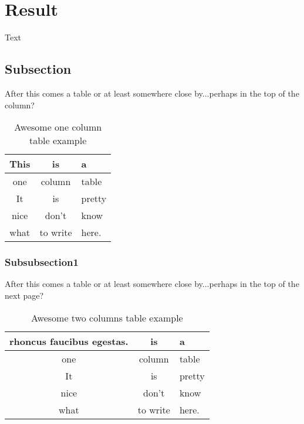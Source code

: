 \section{Result}\label{sec:result}
Text

\subsection{Subsection}
After this comes a table or at least somewhere close by...perhaps in the top
of the column?
\begin{table}
\centering
    \caption{Awesome one column table example}
    \begin{tabular}{|c|c|l|} \hline
    \label{table:one_column}
        This & is & a \\ \hline
        one & column & table\\ \hline
        It & is & pretty \\ \hline
        nice & don't & know \\ \hline
        what & to write & here.\\
        \hline
    \end{tabular}
\end{table}

\subsubsection{Subsubsection1}
After this comes a table or at least somewhere close by...perhaps in the top
of the next page?
\begin{table*}
\centering
    \caption{Awesome two columns table example}
    \begin{tabular}{|c|c|l|} \hline
    \label{table:two_columns}
        rhoncus faucibus egestas. & is & a \\ \hline
        one & column & table\\ \hline
        It & is & pretty \\ \hline
        nice & don't & know \\ \hline
        what & to write & here.\\
        \hline
    \end{tabular}
\end{table*}
